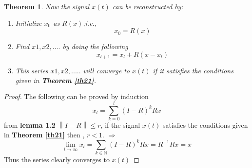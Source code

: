 \documentclass{article}
\newcommand{\norm}[1]{\left\lVert#1\right\rVert}
\newtheorem{theorem}{Theorem}[section]
\begin{document}
\begin{theorem}\label{th22}
Now the signal $x(t)$ can be reconstructed by:
\begin{enumerate}
    \item Initialize $x_0$ as $R(x)$,i.e., 
    \begin{equation}
        x_0=R(x)
    \end{equation}
    \item Find $x1,x2,....$ by doing the following
    \begin{equation}
        x_{l+1} = x_l + R(x-x_l)
    \end{equation}
    \item This series $x1,x2,.....$ will converge to $x(t)$ if it satisfies the conditions given in \textbf{Theorem \ref{th21}}.
\end{enumerate}
\end{theorem}

\begin{proof}
The following can be proved by induction
\begin{equation}
    x_l = \sum_{k=0}^l(I-R)^kRx
\end{equation}
from \textbf{lemma 1.2} $\norm{I-R}\leq r$, if the signal $x(t)$ satisfies the conditions given in \textbf{Theorem \ref{th21}} then , $r < 1$.
$\Rightarrow$
\[
    \lim_{l \to \infty}x_l = \sum_{k\in\mathbb{N}}(I-R)^kRx = R^{-1}Rx = x
\]
Thus the series clearly converges to $x(t)$
\end{proof}
\end{document}
